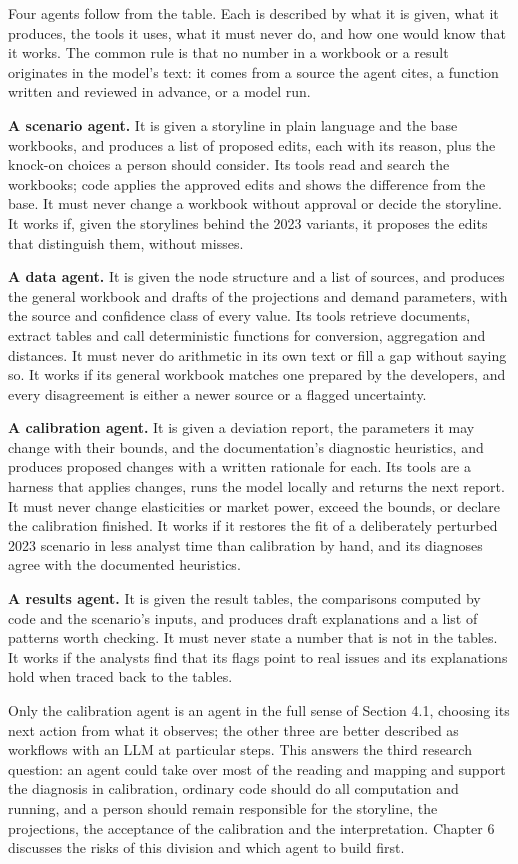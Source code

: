 Four agents follow from the table.
Each is described by what it is given, what it produces, the tools it uses, what it must never do, and how one would know that it works.
The common rule is that no number in a workbook or a result originates in the model's text: it comes from a source the agent cites, a function written and reviewed in advance, or a model run.

\textbf{A scenario agent.} It is given a storyline in plain language and the base workbooks, and produces a list of proposed edits, each with its reason, plus the knock-on choices a person should consider.
Its tools read and search the workbooks; code applies the approved edits and shows the difference from the base.
It must never change a workbook without approval or decide the storyline.
It works if, given the storylines behind the 2023 variants, it proposes the edits that distinguish them, without misses.

\textbf{A data agent.} It is given the node structure and a list of sources, and produces the general workbook and drafts of the projections and demand parameters, with the source and confidence class of every value.
Its tools retrieve documents, extract tables and call deterministic functions for conversion, aggregation and distances.
It must never do arithmetic in its own text or fill a gap without saying so.
It works if its general workbook matches one prepared by the developers, and every disagreement is either a newer source or a flagged uncertainty.

\textbf{A calibration agent.} It is given a deviation report, the parameters it may change with their bounds, and the documentation's diagnostic heuristics, and produces proposed changes with a written rationale for each.
Its tools are a harness that applies changes, runs the model locally and returns the next report.
It must never change elasticities or market power, exceed the bounds, or declare the calibration finished.
It works if it restores the fit of a deliberately perturbed 2023 scenario in less analyst time than calibration by hand, and its diagnoses agree with the documented heuristics.

\textbf{A results agent.} It is given the result tables, the comparisons computed by code and the scenario's inputs, and produces draft explanations and a list of patterns worth checking.
It must never state a number that is not in the tables.
It works if the analysts find that its flags point to real issues and its explanations hold when traced back to the tables.

Only the calibration agent is an agent in the full sense of Section 4.1, choosing its next action from what it observes; the other three are better described as workflows with an LLM at particular steps.
This answers the third research question: an agent could take over most of the reading and mapping and support the diagnosis in calibration, ordinary code should do all computation and running, and a person should remain responsible for the storyline, the projections, the acceptance of the calibration and the interpretation.
Chapter 6 discusses the risks of this division and which agent to build first.
